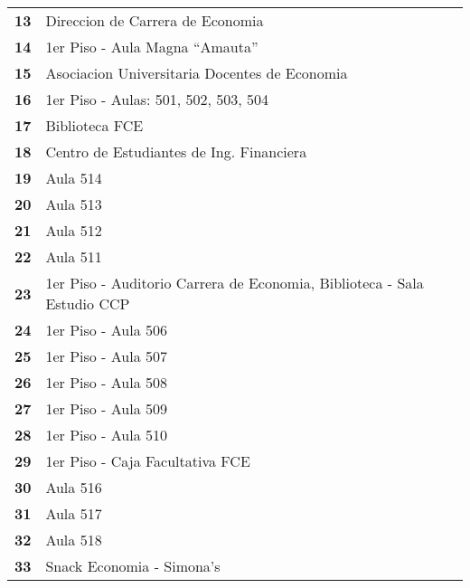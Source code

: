 \begin{longtable}{ c  X }
      \textbf{13}
      &
      Direccion de Carrera de Economia
      \\


      \textbf{14}
      &
      1{\tiny er} Piso - Aula Magna ``Amauta''
      \\

\textbf{15}
&
Asociacion Universitaria Docentes de Economia
\\


\textbf{16}
&
1{\tiny er} Piso - Aulas: 501, 502, 503, 504
\\

\textbf{17}
&
Biblioteca FCE
\\

\textbf{18}
&
Centro de Estudiantes de Ing. Financiera
\\

\textbf{19}
&
Aula 514
\\

\textbf{20}
&
Aula 513
\\

\textbf{21}
&
Aula 512
\\

\textbf{22}
&
Aula 511
\\

\textbf{23}
&
1{\tiny er} Piso - Auditorio Carrera de Economia, Biblioteca - Sala Estudio CCP
\\

\textbf{24}
&
1{\tiny er} Piso - Aula 506
\\

\textbf{25}
&
1{\tiny er} Piso - Aula 507
\\

\textbf{26}
&
1{\tiny er} Piso - Aula 508
\\

\textbf{27}
&
1{\tiny er} Piso - Aula 509
\\

\textbf{28}
&
1{\tiny er} Piso - Aula 510
\\

\textbf{29}
&
1{\tiny er} Piso - Caja Facultativa FCE
\\

\textbf{30}
&
Aula 516
\\

\textbf{31}
&
Aula 517
\\

\textbf{32}
&
Aula 518
\\

\textbf{33}
&
Snack Economia - Simona's
\\



\end{longtable}
